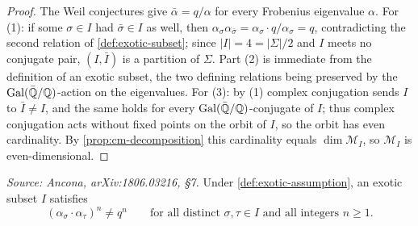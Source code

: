 \begin{proof}
  The Weil conjectures give \(\bar\alpha = q/\alpha\) for every Frobenius
  eigenvalue \(\alpha\). For (1): if some \(\sigma \in I\) had
  \(\bar\sigma \in I\) as well, then \(\alpha_\sigma \alpha_{\bar\sigma}
  = \alpha_\sigma \cdot q/\alpha_\sigma = q\), contradicting the second relation
  of \cref{def:exotic-subset}; since \(|I| = 4 = |\Sigma|/2\) and \(I\) meets no
  conjugate pair, \((I, \bar I)\) is a partition of \(\Sigma\). Part (2) is
  immediate from the definition of an exotic subset, the two defining relations
  being preserved by the \(\mathrm{Gal}(\bar{\mathbb{Q}}/\mathbb{Q})\)-action on the eigenvalues. For (3):
  by (1) complex conjugation sends \(I\) to \(\bar I \neq I\), and the same holds
  for every \(\mathrm{Gal}(\bar{\mathbb{Q}}/\mathbb{Q})\)-conjugate of \(I\); thus complex conjugation acts
  without fixed points on the orbit of \(I\), so the orbit has even cardinality.
  By \cref{prop:cm-decomposition} this cardinality equals
  \(\dim \mathcal{M}_I\), so \(\mathcal{M}_I\) is even-dimensional.
\end{proof}

\begin{lemma}
  \label{lem:exotic-frobenius-power}
  \textit{Source: Ancona, arXiv:1806.03216, §7.}
  Under \cref{def:exotic-assumption}, an exotic subset \(I\) satisfies
  \[(\alpha_\sigma \cdot \alpha_\tau)^n \neq q^n
    \qquad \text{for all distinct } \sigma, \tau \in I
    \text{ and all integers } n \ge 1.\]
\end{lemma}

